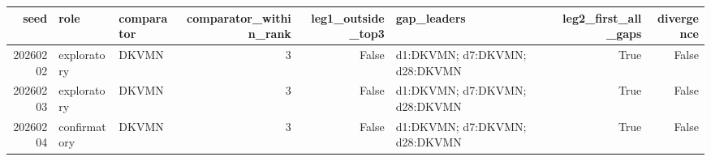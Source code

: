 \begin{tabular}{rllrrlrr}
\toprule
seed & role & comparator & comparator\_within\_rank & leg1\_outside\_top3 & gap\_leaders & leg2\_first\_all\_gaps & divergence \\
\midrule
20260202 & exploratory & DKVMN & 3 & False & d1:DKVMN; d7:DKVMN; d28:DKVMN & True & False \\
20260203 & exploratory & DKVMN & 3 & False & d1:DKVMN; d7:DKVMN; d28:DKVMN & True & False \\
20260204 & confirmatory & DKVMN & 3 & False & d1:DKVMN; d7:DKVMN; d28:DKVMN & True & False \\
\bottomrule
\end{tabular}
